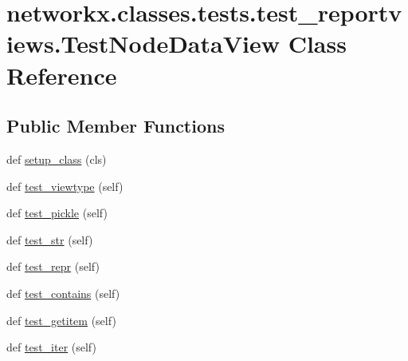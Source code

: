\hypertarget{classnetworkx_1_1classes_1_1tests_1_1test__reportviews_1_1TestNodeDataView}{}\section{networkx.\+classes.\+tests.\+test\+\_\+reportviews.\+Test\+Node\+Data\+View Class Reference}
\label{classnetworkx_1_1classes_1_1tests_1_1test__reportviews_1_1TestNodeDataView}
\subsection*{Public Member Functions}
\begin{DoxyCompactItemize}
\item 
def \hyperlink{classnetworkx_1_1classes_1_1tests_1_1test__reportviews_1_1TestNodeDataView_a191eb6fc71978eaaa95d54db77fb7e1c}{setup\+\_\+class} (cls)
\item 
def \hyperlink{classnetworkx_1_1classes_1_1tests_1_1test__reportviews_1_1TestNodeDataView_a5fa235d9ac242c8fe38b7b5d336f09c8}{test\+\_\+viewtype} (self)
\item 
def \hyperlink{classnetworkx_1_1classes_1_1tests_1_1test__reportviews_1_1TestNodeDataView_a123b1adbaf1c7f5a58fb1d406c95c234}{test\+\_\+pickle} (self)
\item 
def \hyperlink{classnetworkx_1_1classes_1_1tests_1_1test__reportviews_1_1TestNodeDataView_a6cd3965fe0c0a388cc623d960bf1731e}{test\+\_\+str} (self)
\item 
def \hyperlink{classnetworkx_1_1classes_1_1tests_1_1test__reportviews_1_1TestNodeDataView_a3d2af7d6fc90953d9011f715d378dc09}{test\+\_\+repr} (self)
\item 
def \hyperlink{classnetworkx_1_1classes_1_1tests_1_1test__reportviews_1_1TestNodeDataView_a530ced9d870a4cf56ffd078c2d4b17b0}{test\+\_\+contains} (self)
\item 
def \hyperlink{classnetworkx_1_1classes_1_1tests_1_1test__reportviews_1_1TestNodeDataView_a11460058946cd29b25b5f4df79bd3140}{test\+\_\+getitem} (self)
\item 
def \hyperlink{classnetworkx_1_1classes_1_1tests_1_1test__reportviews_1_1TestNodeDataView_aeeff2af3475a0d8af2786cfdad4742c2}{test\+\_\+iter} (self)
\end{DoxyCompactItemize}
